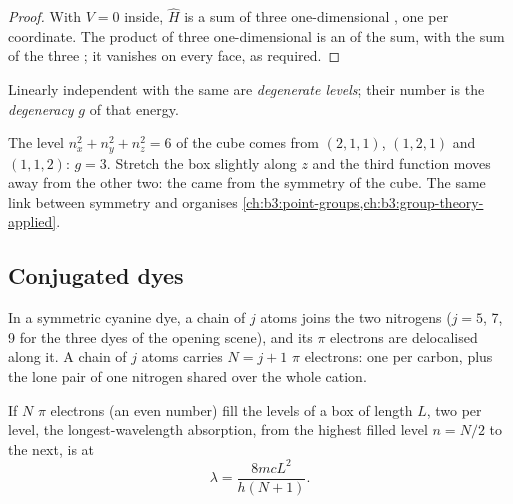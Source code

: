 \begin{proof}
With $V = 0$ inside, $\hat H$ is a sum of three one-dimensional ,
one per coordinate. The product of three one-dimensional  is
an  of the sum, with the sum of the three ; it
vanishes on every face, as required.
\end{proof}

\begin{definition}\label{def:b3:quantum-model-systems:degenerate}
Linearly independent  with the same  are
\emph{degenerate levels}; their number is the
\emph{degeneracy} $g$ of that energy.
\end{definition}

\begin{example}\label{ex:b3:quantum-model-systems:cube}
The level $n_x^2 + n_y^2 + n_z^2 = 6$ of the cube comes from $(2,1,1)$,
$(1,2,1)$ and $(1,1,2)$: $g = 3$. Stretch the box slightly along $z$ and the
third function moves away from the other two: the  came from
the symmetry of the cube. The same link between symmetry and 
organises \cref{ch:b3:point-groups,ch:b3:group-theory-applied}.
\end{example}

\subsection*{Conjugated dyes}

In a symmetric cyanine dye, a chain of $j$ atoms joins the two nitrogens
(\(j = 5\), 7, 9 for the three dyes of the opening scene), and its $\pi$ electrons
are delocalised along it. A chain of $j$ atoms carries $N = j + 1$ $\pi$
electrons: one per carbon, plus the lone pair of one nitrogen shared over
the whole cation.

\begin{proposition}\label{prop:b3:quantum-model-systems:free-electron}
If $N$ $\pi$ electrons (an even number) fill the levels of a box of length $L$,
two per level, the longest-wavelength absorption, from the highest filled
level $n = N/2$ to the next, is at
\[
\lambda = \frac{8mcL^2}{h(N+1)}.
\]
\end{proposition}

